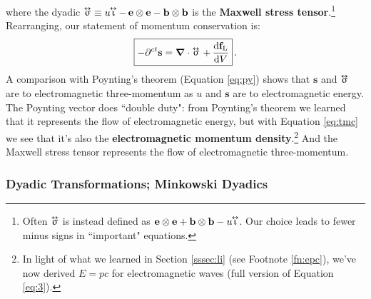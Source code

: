 \documentclass[12pt]{article}
\renewcommand{\vv}[1]{\mathbf{#1}}
\newcommand{\dd}[1]{\mathrm{d}#1}
\newcommand{\del}{\boldsymbol{\nabla}}
\newcommand{\tightoverset}[2]{%
  \mathop{#2}\limits^{\vbox to -.5ex{\kern-0.75ex\hbox{$#1$}\vss}}}
\newcommand{\inlinedy}[1]{\tightoverset{\text{\tiny$\bm\leftrightarrow$}}{#1}}
\begin{document}
where the dyadic $\inlinedy{\upsigma} \equiv u \mkern-4.5mu \inlinedy{\upiota} - \, \vv e \otimes \vv e - \vv b \otimes \vv b$ is the \textbf{Maxwell stress tensor}.\footnote{Often $\inlinedy{\upsigma}$ is instead defined as $\vv e \otimes \vv e + \vv b \otimes \vv b - u \mkern-4.5mu \inlinedy{\upiota}$. Our choice leads to fewer minus signs in ``important" equations.} Rearranging, our statement of momentum conservation is:
\begin{equation}\label{eq:tmc}
\boxed{ - \partial^{ct} \vv s = \del \cdot \inlinedy{\upsigma} \, + \, \dfrac{\dd \vv f_{\mathrm{L}}}{\dd V} } \, .
\end{equation}
A comparison with Poynting's theorem (Equation \ref{eq:py}) shows that $\vv s$ and $\inlinedy{\upsigma}$ are to electromagnetic three-momentum as $u$ and $\vv s$ are to electromagnetic energy. The Poynting vector does ``double duty": from Poynting's theorem we learned that it represents the flow of electromagnetic energy, but with Equation \ref{eq:tmc} we see that it's also the \textbf{electromagnetic momentum density}.\footnote{In light of what we learned in Section \ref{sssec:li} (see Footnote \ref{fn:epc}), we've now derived $E = pc$ for electromagnetic waves (full version of Equation \ref{eq:3}).} And the Maxwell stress tensor represents the flow of electromagnetic three-momentum.


\subsubsection{Dyadic Transformations; Minkowski Dyadics}\label{sssec:md}
\end{document}
